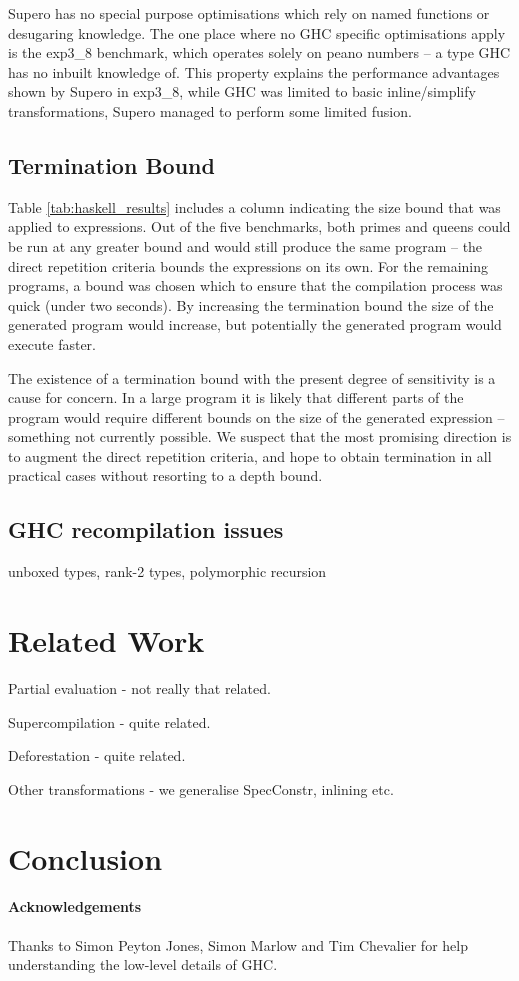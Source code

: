 \documentclass{llncs}
\begin{document}
Supero has no special purpose optimisations which rely on named functions or desugaring knowledge. The one place where no GHC specific optimisations apply is the exp3\_8 benchmark, which operates solely on peano numbers -- a type GHC has no inbuilt knowledge of. This property explains the performance advantages shown by Supero in exp3\_8, while GHC was limited to basic inline/simplify transformations, Supero managed to perform some limited fusion.

\subsection{Termination Bound}

Table \ref{tab:haskell_results} includes a column indicating the size bound that was applied to expressions. Out of the five benchmarks, both primes and queens could be run at any greater bound and would still produce the same program -- the direct repetition criteria bounds the expressions on its own. For the remaining programs, a bound was chosen which to ensure that the compilation process was quick (under two seconds). By increasing the termination bound the size of the generated program would increase, but potentially the generated program would execute faster.

The existence of a termination bound with the present degree of sensitivity is a cause for concern. In a large program it is likely that different parts of the program would require different bounds on the size of the generated expression -- something not currently possible. We suspect that the most promising direction is to augment the direct repetition criteria, and hope to obtain termination in all practical cases without resorting to a depth bound. 

\subsection{GHC recompilation issues}

unboxed types, rank-2 types, polymorphic recursion

\section{Related Work}

Partial evaluation - not really that related.

Supercompilation - quite related.

Deforestation - quite related.

Other transformations - we generalise SpecConstr, inlining etc.

\section{Conclusion}

\paragraph{Acknowledgements} Thanks to Simon Peyton Jones, Simon Marlow and Tim Chevalier for help understanding the low-level details of GHC.




\end{document}
